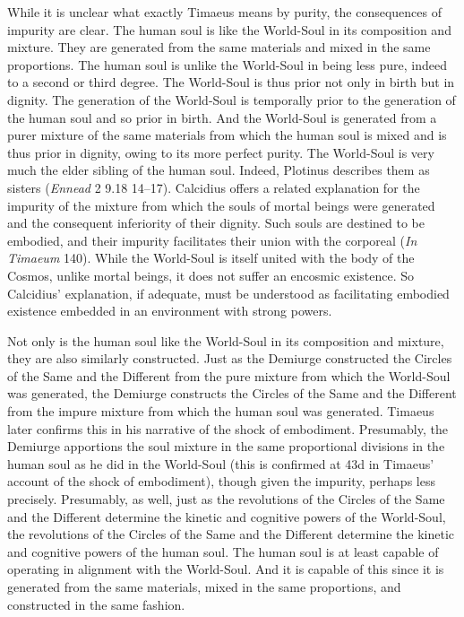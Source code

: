 While it is unclear what exactly Timaeus means by purity, the consequences of impurity are clear. The human soul is like the World-Soul in its composition and mixture. They are generated from the same materials and mixed in the same proportions. The human soul is unlike the World-Soul in being less pure, indeed to a second or third degree. The World-Soul is thus prior not only in birth but in dignity. The generation of the World-Soul is temporally prior to the generation of the human soul and so prior in birth. And the World-Soul is generated from a purer mixture of the same materials from which the human soul is mixed and is thus prior in dignity, owing to its more perfect purity. The World-Soul is very much the elder sibling of the human soul. Indeed, Plotinus describes them as sisters (\emph{Ennead} 2 9.18 14--17). Calcidius offers a related explanation for the impurity of the mixture from which the souls of mortal beings were generated and the consequent inferiority of their dignity. Such souls are destined to be embodied, and their impurity facilitates their union with the corporeal (\emph{In Timaeum} 140). While the World-Soul is itself united with the body of the Cosmos, unlike mortal beings, it does not suffer an encosmic existence. So Calcidius' explanation, if adequate, must be understood as facilitating embodied existence embedded in an environment with strong powers.

Not only is the human soul like the World-Soul in its composition and mixture, they are also similarly constructed. Just as the Demiurge constructed the Circles of the Same and the Different from the pure mixture from which the World-Soul was generated, the Demiurge constructs the Circles of the Same and the Different from the impure mixture from which the human soul was generated. Timaeus later confirms this in his narrative of the shock of embodiment. Presumably, the Demiurge apportions the soul mixture in the same proportional divisions in the human soul as he did in the World-Soul (this is confirmed at 43d in Timaeus' account of the shock of embodiment), though given the impurity, perhaps less precisely. Presumably, as well, just as the revolutions of the Circles of the Same and the Different determine the kinetic and cognitive powers of the World-Soul, the revolutions of the Circles of the Same and the Different determine the kinetic and cognitive powers of the human soul. The human soul is at least capable of operating in alignment with the World-Soul. And it is capable of this since it is generated from the same materials, mixed in the same proportions, and constructed in the same fashion.

